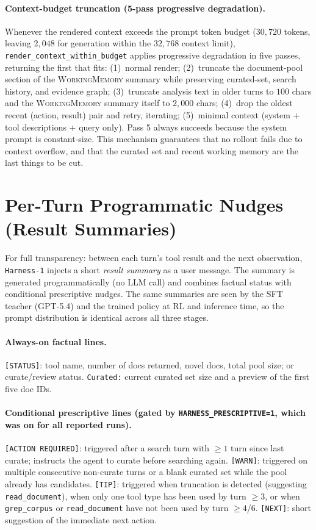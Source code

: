 \documentclass{article}
\newcommand{\sys}{\texttt{Harness-1}\xspace}
\newcommand{\wm}{\textsc{WorkingMemory}\xspace}
\begin{document}
\paragraph{Context-budget truncation (5-pass progressive
degradation).} Whenever the rendered context exceeds the prompt
token budget ($30{,}720$ tokens, leaving $2{,}048$ for
generation within the $32{,}768$ context limit),
\texttt{render\_context\_within\_budget} applies progressive
degradation in five passes, returning the first that fits:
(1)~normal render; (2)~truncate the document-pool section of the
\wm summary while preserving curated-set, search history, and
evidence graph; (3)~truncate analysis text in older turns to
$100$ chars and the \wm summary itself to $2{,}000$ chars;
(4)~drop the oldest recent (action, result) pair and retry,
iterating; (5)~minimal context (system $+$ tool descriptions $+$
query only). Pass 5 always succeeds because the system prompt is
constant-size. This mechanism guarantees that no rollout fails
due to context overflow, and that the curated set and recent
working memory are the last things to be cut.

\section{Per-Turn Programmatic Nudges (Result Summaries)}
\label{app:nudges}

For full transparency: between each turn's tool result and the
next observation, \sys injects a short \emph{result summary} as
a user message. The summary is generated programmatically (no
LLM call) and combines factual status with conditional prescriptive nudges.
The same summaries are seen by the SFT teacher (GPT-5.4) and
the trained policy at RL and inference time, so the prompt
distribution is identical across all three stages.

\paragraph{Always-on factual lines.}
\texttt{[STATUS]}: tool name, number of docs returned, novel
docs, total pool size; or curate/review status.
\texttt{Curated:} current curated set size and a preview of the
first five doc IDs.

\paragraph{Conditional prescriptive lines (gated by
\texttt{HARNESS\_PRESCRIPTIVE=1}, which was on for all reported
runs).}
\texttt{[ACTION REQUIRED]}: triggered after a search turn with
$\geq 1$ turn since last curate; instructs the agent to curate
before searching again.
\texttt{[WARN]}: triggered on multiple consecutive non-curate
turns or a blank curated set while the pool already has candidates.
\texttt{[TIP]}: triggered when truncation is detected
(suggesting \texttt{read\_document}), when only one tool type
has been used by turn $\geq 3$, or when \texttt{grep\_corpus} or
\texttt{read\_document} have not been used by turn $\geq 4$/$6$.
\texttt{[NEXT]}: short suggestion of the immediate next action.
\end{document}
